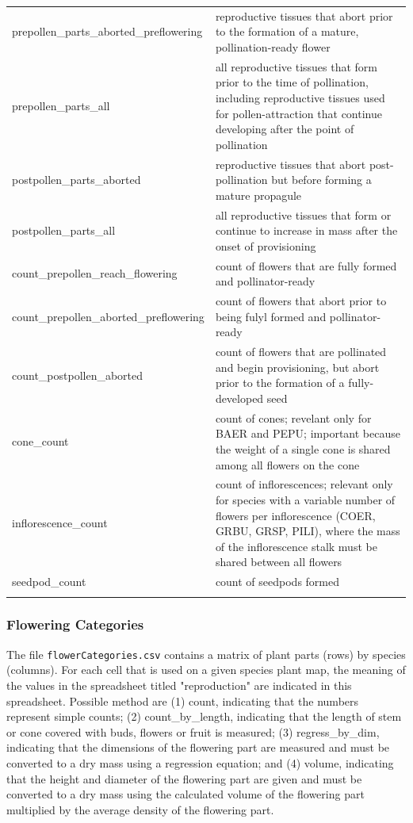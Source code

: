 \documentclass[10pt,twoside]{article}\usepackage[]{graphicx}\usepackage[]{color}
\begin{document}
\begin{longtable}{p{6cm}p{10cm}}
  prepollen\_parts\_aborted\_preflowering & reproductive tissues that abort prior to the formation of a mature, pollination-ready flower \\ 
  prepollen\_parts\_all & all reproductive tissues that form prior to the time of pollination, including reproductive tissues used for pollen-attraction that continue developing after the point of pollination \\ 
  postpollen\_parts\_aborted & reproductive tissues that abort post-pollination but before forming a mature propagule \\ 
  postpollen\_parts\_all & all reproductive tissues that form or continue to increase in mass after the onset of provisioning \\ 
  count\_prepollen\_reach\_flowering & count of flowers that are fully formed and pollinator-ready \\ 
  count\_prepollen\_aborted\_preflowering & count of flowers that abort prior to being fulyl formed and pollinator-ready \\ 
  count\_postpollen\_aborted  & count of flowers that are pollinated and begin provisioning, but abort prior to the formation of a fully-developed seed \\ 
  cone\_count & count of cones; revelant only for BAER and PEPU; important because the weight of a single cone is shared among all flowers on the cone \\ 
  inflorescence\_count & count of inflorescences; relevant only for species with a variable number of flowers per inflorescence (COER, GRBU, GRSP, PILI), where the mass of the inflorescence stalk must be shared between all flowers \\ 
  seedpod\_count & count of seedpods formed \\ 
   \hline
\hline
\label{tab:accessoryParts_meta}
\end{longtable}
\endgroup



\subsubsection{Flowering Categories}

The file \texttt{flowerCategories.csv} contains a matrix of plant parts (rows) by species (columns). For each cell that is used on a given species plant map, the meaning of the values in the spreadsheet titled "reproduction" are indicated in this spreadsheet. Possible method are (1) count, indicating that the numbers represent simple counts; (2) count\_by\_length, indicating that the length of stem or cone covered with buds, flowers or fruit is measured; (3) regress\_by\_dim, indicating that the dimensions of the flowering part are measured and must be converted to a dry mass using a regression equation; and (4) volume, indicating that the height and diameter of the flowering part are given and must be converted to a dry mass using the calculated volume of the flowering part multiplied by the average density of the flowering part.
\end{document}
